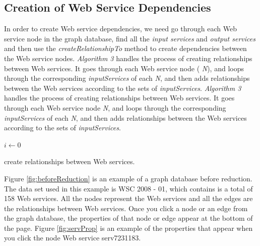 \subsection {Creation of Web Service Dependencies}
In order to create Web service dependencies,  we need go through each Web service node in the graph database, find all the  \emph{input services} and  \emph{output services} and then use the  \emph{createRelationshipTo} method to create dependencies between the Web service nodes.  \emph{Algorithm 3} handles the process of creating relationships between Web services. It goes through each Web service node ( \emph{N}), and loops through the corresponding  \emph{inputServices} of each  \emph{N}, and then adds relationships between the Web services according to the sets of  \emph{inputServices}. \emph{Algorithm 3} handles the process of creating relationships between Web services. It goes through each Web service node \emph{N}, and loops through the corresponding \emph{inputServices} of each \emph{N}, and then adds relationships between the Web services according to the sets of \emph{inputServices}.

\setlength{\textfloatsep}{20pt}%
\begin{algorithm}[H]
 \LinesNumbered
 \SetNlSty{}{}{:}
 $i \leftarrow 0$\;
 \caption{\footnotesize create relationships between Web services.}
\label{generation}
\end{algorithm}
\setlength{\textfloatsep}{20pt}%

\begin{example}
\noindent
Figure \ref{fig:beforeReduction} is an example of a graph database before reduction. The data set used in this example is WSC 2008 - 01, which contains is a total of 158 Web services. All the nodes represent the Web services and all the edges are the relationships between Web services. Once you click a node or an edge from the graph database, the properties of that node or edge appear at the bottom of the page. Figure \ref{fig:servProp} is an example of the properties that appear when you click the node Web service serv7231183. \par
\end{example}

